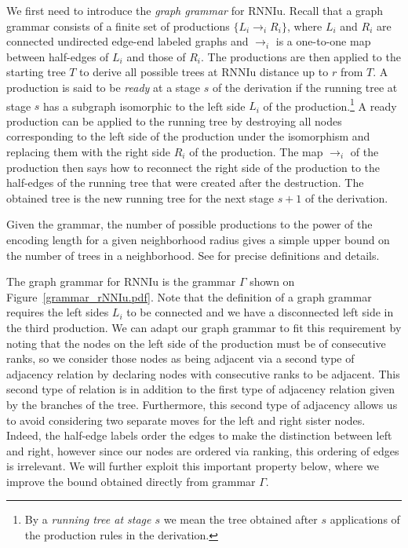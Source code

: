 \documentclass[11pt]{amsart}
\theoremstyle{definition}
\newcommand{\rnniu}{\mathrm{RNNIu}}
\begin{document}
We first need to introduce the \emph{graph grammar} for $\rnniu$.
Recall that a graph grammar consists of a finite set of productions $\{L_i \to_i R_i\}$, where $L_i$ and $R_i$ are connected undirected edge-end labeled graphs and $\to_i$ is a one-to-one map between half-edges of $L_i$ and those of $R_i$.
The productions are then applied to the starting tree $T$ to derive all possible trees at $\rnniu$ distance up to $r$ from $T$.
A production is said to be \emph{ready} at a stage $s$ of the derivation if the running tree at stage $s$ has a subgraph isomorphic to the left side $L_i$ of the production.\footnote{
By a \emph{running tree at stage $s$} we mean the tree obtained after $s$ applications of the production rules in the derivation.}
A ready production can be applied to the running tree by destroying all nodes corresponding to the left side of the production under the isomorphism and replacing them with the right side $R_i$ of the production.
The map $\to_i$ of the production then says how to reconnect the right side of the production to the half-edges of the running tree that were created after the destruction.
The obtained tree is the new running tree for the next stage $s+1$ of the derivation.

Given the grammar, the number of possible productions to the power of the encoding length for a given neighborhood radius gives a simple upper bound on the number of trees in a neighborhood.
See \autocite{Sleator1992-bp} for precise definitions and details.

The graph grammar for $\rnniu$ is the grammar $\Gamma$ shown on Figure~\ref{grammar_rNNIu.pdf}.
Note that the definition of a graph grammar requires the left sides $L_i$ to be connected and we have a disconnected left side in the third production.
We can adapt our graph grammar to fit this requirement by noting that the nodes on the left side of the production must be of consecutive ranks, so we consider those nodes as being adjacent via a second type of adjacency relation by declaring nodes with consecutive ranks to be adjacent.
This second type of relation is in addition to the first type of adjacency relation given by the branches of the tree.
Furthermore, this second type of adjacency allows us to avoid considering two separate moves for the left and right sister nodes.
Indeed, the half-edge labels order the edges to make the distinction between left and right, however since our nodes are ordered via ranking, this ordering of edges is irrelevant.
We will further exploit this important property below, where we improve the bound obtained directly from grammar $\Gamma$.
\end{document}
